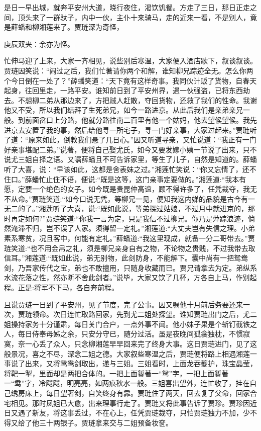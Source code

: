 \begin{parag}
    是日一早出城，就奔平安州大道，晓行夜住，渴饮饥餐。方走了三日，那日正走之间，顶头来了一群驮子，内中一伙，主仆十来骑马，走的近来一看，不是别人，竟是薛蟠和柳湘莲来了。贾琏深为奇怪，\begin{note}庚辰双夹：余亦为怪。\end{note}忙伸马迎了上来，大家一齐相见，说些别后寒温，大家便入酒店歇下，叙谈叙谈。贾琏因笑说：“闹过之后，我们忙著请你两个和解，谁知柳兄踪迹全无。怎么你两个今日倒在一处了？”薛蟠笑道：“天下竟有这样奇事。我同伙计贩了货物，自春天起身，往回里走，一路平安。谁知前日到了平安州界，遇一伙强盗，已将东西劫去。不想柳二弟从那边来了，方把贼人赶散，夺回货物，还救了我们的性命。我谢他又不受，所以我们结拜了生死弟兄，如今一路进京。从此后我们是亲弟亲兄一般。到前面岔口上分路，他就分路往南二百里有他一个姑妈，他去望候望候。我先进京去安置了我的事，然后给他寻一所宅子，寻一门好亲事，大家过起来。”贾琏听了道：“原来如此，倒教我们悬了几日心。”因又听道寻亲，又忙说道：“我正有一门好亲事堪配二弟。”说著，便将自己娶尤氏，如今又要发嫁小姨一节说了出来，只不说尤三姐自择之语。又嘱薛蟠且不可告诉家里，等生了儿子，自然是知道的。薛蟠听了大喜，说：“早该如此，这都是舍表妹之过。”湘莲忙笑说：“你又忘情了，还不住口。”薛蟠忙止住不语，便说:“既是这等，这门亲事定要做的。”湘莲道:“我本有愿，定要一个绝色的女子。如今既是贵昆仲高谊，顾不得许多了，任凭裁夺，我无不从命。”贾琏笑道:“如今口说无凭，等柳兄一见，便知我这内娣的品貌是古今有一无二的了。”湘莲听了大喜，说:“既如此说，等弟探过姑娘，不过月中就进京的，那时再定如何?”贾琏笑道:“你我一言为定，只是我信不过柳兄。你乃是萍踪浪迹，倘然淹滞不归，岂不误了人家。须得留一定礼。”湘莲道:“大丈夫岂有失信之理。小弟素系寒贫，况且客中，何能有定礼。”薛蟠道:“我这里现成，就备一分二哥带去。”贾琏笑道:“也不用金帛之礼，须是柳兄亲身自有之物，不论物之贵贱，不过我带去取信耳。”湘莲道:“既如此说，弟无别物，此剑防身，不能解下。囊中尚有一把鸳鸯剑，乃吾家传代之宝，弟也不敢擅用，只随身收藏而已。贾兄请拿去为定。弟纵系水流花落之性，然亦断不舍此剑者。”说毕，大家又饮了几杯，方各自上马，作别起程。正是:将军不下马，各自奔前程。
\end{parag}


\begin{parag}
    且说贾琏一日到了平安州，见了节度，完了公事。因又嘱他十月前后务要还来一次，贾琏领命。次日连忙取路回家，先到尤二姐处探望。谁知贾琏出门之后，尤二姐操持家务十分谨肃，每日关门合户，一点外事不闻。他小妹子果是个斩钉截铁之人，每日侍奉母姊之余，只安分守已，随分过活。虽是夜晚间孤衾独枕，不惯寂寞，奈一心丢了众人，只念柳湘莲早早回来完了终身大事。这日贾琏进门，见了这般景况，喜之不尽，深念二姐之德。大家叙些寒温之后，贾琏便将路上相遇湘莲一事说了出来，又将鸳鸯剑取出，递与三姐。三姐看时，上面龙吞夔护，珠宝晶莹，将靶一掣，里面却是两把合体的。一把上面錾著一“鸳”字，一把上面錾著一“鸯”字，冷飕飕，明亮亮，如两痕秋水一般。三姐喜出望外，连忙收了，挂在自己绣房床上，每日望著剑，自笑终身有靠。贾琏住了两天，回去复了父命，回家合宅相见。那时凤姐已大愈，出来理事行走了。贾琏又将此事告诉了贾珍。贾珍因近日又遇了新友，将这事丢过，不在心上，任凭贾琏裁夺，只怕贾琏独力不加，少不得又给了他三十两银子。贾琏拿来交与二姐预备妆奁。
\end{parag}


